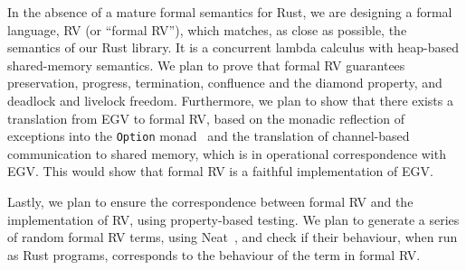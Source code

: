 \documentclass[copyright,creativecommons]{eptcs}
\begin{document}
In the absence of a mature formal semantics for Rust, we are designing a formal language, RV (or ``formal RV''), which matches, as close as possible, the semantics of our Rust library. It is a concurrent lambda calculus with heap-based shared-memory semantics. We plan to prove that formal RV guarantees preservation, progress, termination, confluence and the diamond property, and deadlock and livelock freedom. Furthermore, we plan to show that there exists a translation from EGV to formal RV, based on the monadic reflection of exceptions into the \lstinline{Option} monad~\cite{filinski1994} and the translation of channel-based communication to shared memory, which is in operational correspondence with EGV. This would show that formal RV is a faithful implementation of EGV.

Lastly, we plan to ensure the correspondence between formal RV and the implementation of RV, using property-based testing. We plan to generate a series of random formal RV terms, using Neat~\cite{claessen2015}, and check if their behaviour, when run as Rust programs, corresponds to the behaviour of the term in formal RV.



\end{document}
